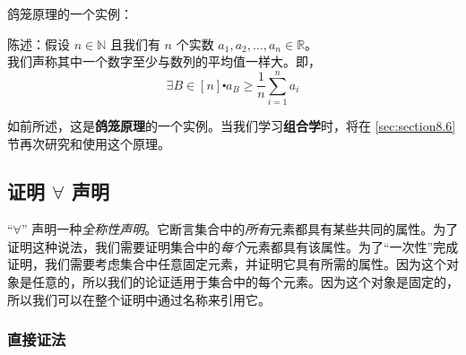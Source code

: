 \begin{example}
    鸽笼原理的一个实例：
    \begin{center}
        陈述：假设 $n \in \mathbb{N}$ 且我们有 $n$ 个实数 $a_1, a_2, \dots, a_n \in \mathbb{R}$。\\
        我们声称其中一个数字至少与数列的平均值一样大。即，
        \[\exists B \in [n] \centerdot a_B \ge \frac{1}{n}\sum_{i=1}^{n}a_i\]
    \end{center}

    \begin{center}
        \noindent {}
    \end{center}

    如前所述，这是\textbf{鸽笼原理}的一个实例。当我们学习\textbf{组合学}时，将在 \ref{sec:section8.6} 节再次研究和使用这个原理。
\end{example}

\subsection{证明 $\forall$ 声明}\label{sec:section4.9.2}

``$\forall$'' 声明一种\emph{全称性声明}。它断言集合中的\emph{所有}元素都具有某些共同的属性。为了证明这种说法，我们需要证明集合中的\emph{每个}元素都具有该属性。为了``一次性''完成证明，我们需要考虑集合中任意固定元素，并证明它具有所需的属性。因为这个对象是任意的，所以我们的论证适用于集合中的每个元素。因为这个对象是固定的，所以我们可以在整个证明中通过名称来引用它。

\subsubsection*{直接证法}

